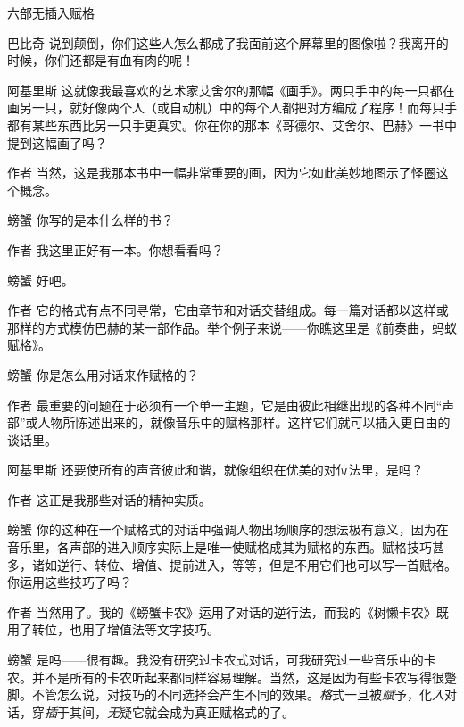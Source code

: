 \begin{dialog}{六部无插入赋格}
\begin{dialogue}
\item[巴比奇]说到颠倒，你们这些人怎么都成了我面前这个屏幕里的图像啦？我离开的时候，你们还都是有血有肉的呢！

\item[阿基里斯]这就像我最喜欢的艺术家艾舍尔的那幅《画手》。两只手中的每一只都在画另一只，就好像两个人（或自动机）中的每个人都把对方编成了程序！而每只手都有某些东西比另一只手更真实。你在你的那本《哥德尔、艾舍尔、巴赫》一书中提到这幅画了吗？

\item[作者]当然，这是我那本书中一幅非常重要的画，因为它如此美妙地图示了怪圈这个概念。

\item[螃蟹]你写的是本什么样的书？

\item[作者]我这里正好有一本。你想看看吗？

\item[螃蟹]好吧。

\item[作者]它的格式有点不同寻常，它由章节和对话交替组成。每一篇对话都以这样或那样的方式模仿巴赫的某一部作品。举个例子来说——你瞧这里是《前奏曲，蚂蚁赋格》。

\item[螃蟹]你是怎么用对话来作赋格的？

\item[作者]最重要的问题在于必须有一个单一主题，它是由彼此相继出现的各种不同“声部”或人物所陈述出来的，就像音乐中的赋格那样。这样它们就可以插入更自由的谈话里。

\item[阿基里斯]还要使所有的声音彼此和谐，就像组织在优美的对位法里，是吗？

\item[作者]这正是我那些对话的精神实质。

\item[螃蟹]你的这种在一个赋格式的对话中强调人物出场顺序的想法极有意义，因为在音乐里，各声部的进入顺序实际上是唯一使赋格成其为赋格的东西。赋格技巧甚多，诸如逆行、转位、增值、提前进入，等等，但是不用它们也可以写一首赋格。你运用这些技巧了吗？

\item[作者]当然用了。我的《螃蟹卡农》运用了对话的逆行法，而我的《树懒卡农》既用了转位，也用了增值法等文字技巧。

\item[螃蟹]是吗——很有趣。我没有研究过卡农式对话，可我研究过一些音乐中的卡农。并不是所有的卡农听起来都同样容易理解。当然，这是因为有些卡农写得很蹩脚。不管怎么说，对技巧的不同选择会产生不同的效果。\emph{格}式一旦被\emph{赋}予，化\emph{入}对话，穿\emph{插}于其间，\emph{无}疑它就会成为真正赋格式的了。


\end{dialogue}
\end{dialog}
